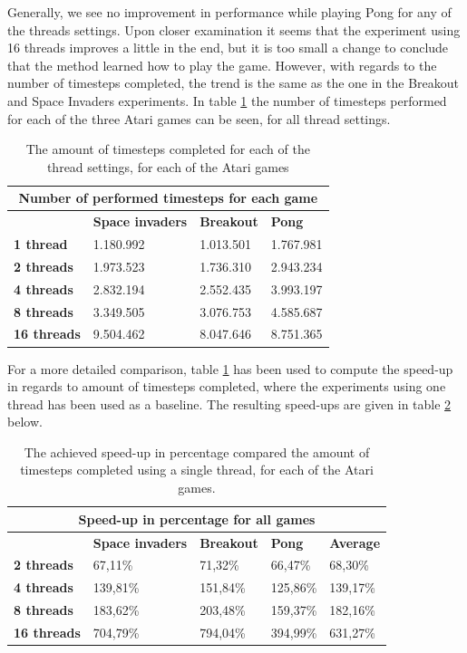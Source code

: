 \documentclass[11pt]{article}
\begin{document}
Generally, we see no improvement in performance while playing Pong for any of the threads settings.
Upon closer examination it seems that the experiment using 16 threads improves a little
in the end, but it is too small a change to conclude that the method learned how to play the 
game.
However, with regards to the number of timesteps completed,
the trend is the same as the one in the Breakout and Space Invaders
experiments.
In table \ref{table:compare_timesteps} the number of timesteps performed
for each of the three Atari games can be seen, for all thread settings.
\begin{table}[H]
\centering
\begin{tabular}{ |p{2cm}||p{3cm}|p{3cm}|p{3cm}|  }
 \hline
 \multicolumn{4}{|c|}{Number of performed timesteps for each game} \\
 \hline
  & \textbf{Space invaders}  & \textbf{Breakout} & \textbf{Pong}\\
 \hline
 \textbf{1 thread}   & 1.180.992    & 1.013.501&   1.767.981\\
 \hline
 \textbf{2 threads}&   1.973.523  & 1.736.310   & 2.943.234\\
 \hline
 \textbf{4 threads}& 2.832.194 & 2.552.435&  3.993.197\\
 \hline
 \textbf{8 threads}   & 3.349.505 & 3.076.753 &  4.585.687\\
 \hline
 \textbf{16 threads}&   9.504.462  & 8.047.646 & 8.751.365\\
 \hline
\end{tabular}
\caption{The amount of timesteps completed for each of the thread settings, for each of the Atari games}
\label{table:compare_timesteps}
\end{table}

For a more detailed comparison, table \ref{table:compare_timesteps} has been used
to compute the speed-up in regards to amount of timesteps completed,
where the experiments using one thread has been used as a baseline.
The resulting speed-ups are given in table \ref{tab:speed-up} below.

\begin{table}[H]
\centering
\begin{tabular}{ |p{2cm}||p{2.8cm}|p{2.8cm}|p{2.8cm}|p{2.8cm}|  }
 \hline
 \multicolumn{5}{|c|}{Speed-up in percentage for all games} \\
 \hline
 & \textbf{Space invaders}  & \textbf{Breakout} & \textbf{Pong} & \textbf{Average}\\
 \hline
 \textbf{2 threads}&   67,11\%  & 71,32\%   & 66,47\% & 68,30\%\\
 \hline
 \textbf{4 threads}& 139,81\% & 151,84\% &  125,86\% & 139,17\%\\
 \hline
 \textbf{8 threads}   & 183,62\% & 203,48\% &  159,37\% & 182,16\%\\
 \hline
 \textbf{16 threads}&   704,79\%  & 794,04\% & 394,99\% & 631,27\%\\
 \hline
\end{tabular}
\caption{The achieved speed-up in percentage compared the amount of timesteps completed using
a single thread, for each of the Atari games.}
\label{tab:speed-up}
\end{table}
\end{document}
